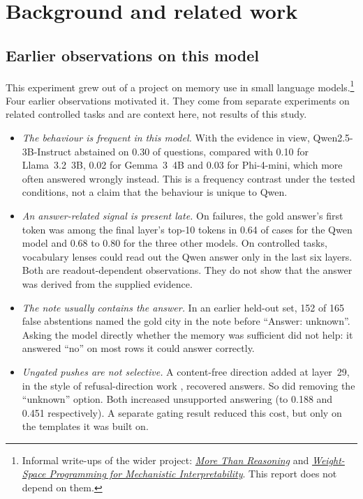 \section{Background and related work}
\label{sec:related}

\subsection{Earlier observations on this model}
\label{sec:background}

This experiment grew out of a project on memory use in small language models.\footnote{Informal write-ups of the
wider project: \href{https://qamil-mirza.com/research/more-than-reasoning}{\emph{More Than Reasoning}} and
\href{https://qamil-mirza.com/research/ai-brain-surgery}{\emph{Weight-Space Programming for Mechanistic
Interpretability}}. This report does not depend on them.}
Four earlier observations motivated it. They come from separate experiments on related controlled tasks and are
context here, not results of this study.
\begin{itemize}[leftmargin=*]
  \item \emph{The behaviour is frequent in this model.} With the evidence in view, Qwen2.5-3B-Instruct abstained on
        0.30 of questions, compared with 0.10 for Llama~3.2~3B, 0.02 for Gemma~3~4B and 0.03 for Phi-4-mini, which
        more often answered wrongly instead. This is a frequency contrast under the tested conditions, not a claim
        that the behaviour is unique to Qwen.
  \item \emph{An answer-related signal is present late.} On failures, the gold answer's first token was among the
        final layer's top-10 tokens in 0.64 of cases for the Qwen model and 0.68 to 0.80 for the three other models.
        On controlled tasks, vocabulary lenses could read out the Qwen answer only in the last six layers. Both are
        readout-dependent observations. They do not show that the answer was derived from the supplied evidence.
  \item \emph{The note usually contains the answer.} In an earlier held-out set, 152 of 165 false abstentions named
        the gold city in the note before ``Answer: unknown''. Asking the model directly whether the memory was
        sufficient did not help: it answered ``no'' on most rows it could answer correctly.
  \item \emph{Ungated pushes are not selective.} A content-free direction added at layer~29, in the style of
        refusal-direction work \citep{arditi2024refusal,lavi2025unanswerability}, recovered answers. So did removing
        the ``unknown'' option. Both increased unsupported answering (to 0.188 and 0.451 respectively). A separate
        gating result reduced this cost, but only on the templates it was built on.
\end{itemize}

